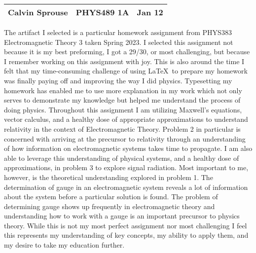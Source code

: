 \documentclass[a4paper, 12pt]{config/homework}
\begin{document}
\noindent
\begin{tabularx}{\textwidth}{>{\centering\arraybackslash}X>{\centering\arraybackslash}X>{\centering\arraybackslash}X}
Calvin Sprouse & PHYS489 1A & 2024 Jan 12\\
\midrule
\end{tabularx}


The artifact I selected is a particular homework assignment from PHYS383 Electromagnetic Theory 3 taken Spring 2023. I selected this assignment not because it is my best preforming, I got a 29/30, or most challenging, but because I remember working on this assignment with joy. This is also around the time I felt that my time-consuming challenge of using \LaTeX\ to prepare my homework was finally paying off and improving the way I did physics. Typesetting my homework has enabled me to use more explanation in my work which not only serves to demonstrate my knowledge but helped me understand the process of doing physics. Throughout this assignment I am utilizing Maxwell's equations, vector calculus, and a healthy dose of appropriate approximations to understand relativity in the context of Electromagnetic Theory. Problem 2 in particular is concerned with arriving at the precursor to relativity through an understanding of how information on electromagnetic systems takes time to propagate. I am also able to leverage this understanding of physical systems, and a healthy dose of approximations, in problem 3 to explore signal radiation. Most important to me, however, is the theoretical understanding explored in problem 1. The determination of gauge in an electromagnetic system reveals a lot of information about the system before a particular solution is found. The problem of determining gauge shows up frequently in electromagnetic theory and understanding how to work with a gauge is an important precursor to physics theory. While this is not my most perfect assignment nor most challenging I feel this represents my understanding of key concepts, my ability to apply them, and my desire to take my education further.


\end{document}
